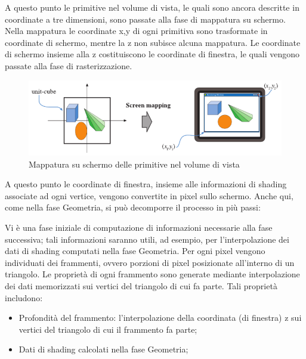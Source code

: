 A questo punto le primitive nel volume di vista, le quali sono ancora descritte in coordinate a tre dimensioni, sono passate alla fase di mappatura su schermo. 
Nella mappatura le coordinate x,y di ogni primitiva sono trasformate in coordinate di schermo, mentre la z non subisce alcuna mappatura.
Le coordinate di schermo insieme alla z costituiscono le coordinate di finestra, le quali vengono passate alla fase di rasterizzazione.

\begin{figure}[htb]
 \centering
 \includegraphics[width=1.0\linewidth]{images/chapter_stato_arte/stato_arte_mapping.png}\hfill
 \caption[Mappatura su schermo]{Mappatura su schermo delle primitive nel volume di vista}
 \label{fig:stato_arte_mapping}
\end{figure}

A questo punto le coordinate di finestra, insieme alle informazioni di shading associate ad ogni vertice, vengono convertite in pixel sullo schermo. Anche qui, come nella fase Geometria, si può decomporre il processo in più passi:

Vi è una fase iniziale di computazione di informazioni necessarie alla fase successiva; tali informazioni saranno utili, ad esempio, per l’interpolazione dei dati di shading computati nella fase Geometria.
Per ogni pixel vengono individuati dei frammenti, ovvero porzioni di pixel posizionate all’interno di un triangolo. Le proprietà di ogni frammento sono generate mediante interpolazione dei dati memorizzati sui vertici del triangolo di cui fa parte. 
Tali proprietà includono:

\begin{itemize}
\item Profondità del frammento: l’interpolazione della coordinata (di finestra) z sui vertici del triangolo di cui il frammento fa parte;
\item Dati di shading calcolati nella fase Geometria;
\end{itemize}


